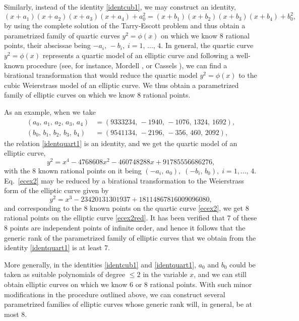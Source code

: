 \documentclass[11pt, leqno]{article}
\begin{document}
Similarly, instead of the identity \eqref{identcub1}, we may construct an identity,
 \begin{equation}
(x+a_1)(x+a_2)(x+a_3)(x+a_4)+a_0^2=(x+b_1)(x+b_2)(x+b_3)(x+b_4)+b_0^2, \label{identquart1}
\end{equation}
by using the complete solution of the Tarry-Escott problem \cite[p. 55-58]{Di} and thus obtain a parametrized family of quartic curves 
$y^2=\phi(x)$  on which we know  8 rational points, their  abscissae  being $-a_i,\,-b_i,\;i=1,\,\ldots,\,4$. In general, the quartic curve $y^2=\phi(x)$ represents a quartic model of an elliptic curve and following a well-known procedure (see, for instance, Mordell \cite[p. 77]{Mo}, or Cassels \cite[pp. 35-36]{Ca2}), we can find a birational transformation that would reduce the quartic model $y^2=\phi(x)$ to the cubic Weierstrass model of an elliptic curve. We thus obtain a parametrized family of elliptic curves on which we know 8  rational points. 

As an example, when we take 
\begin{equation*}
\begin{aligned}
(a_0,\,a_1,\,a_2,\,a_3,\,a_4)&=(9333234,\, -1940, \, -1076, \, 1324, \, 1692),\\
(b_0,\,b_1,\,b_2,\,b_3,\,b_4)&=(9541134,\, -2196,\, -356,\, 460,\, 2092),
\end{aligned}
\end{equation*}
the relation \eqref{identquart1} is an identity, and we get the quartic model of an elliptic curve,
\begin{equation}
y^2=x^4-4768608x^2-460748288x+91785556686276, \label{ecex2}
\end{equation}
with the 8 known rational points on it being $(-a_i,\,a_0),\;(-b_i,\,b_0),\;i=1,\ldots,\,4$. Eq.~\eqref{ecex2} may be reduced by a birational transformation to the Weierstrass form of the elliptic curve given by
\begin{equation}
 y^2 = x^3 - 23420131301937 + 18114867816009096080, \label{ecex2red}
\end{equation}
and corresponding to the 8 known points on the quartic curve \eqref{ecex2}, we get 8 rational points on the elliptic curve \eqref{ecex2red}. It has been verified that 7 of these 8 points are independent points of infinite order, and hence it follows that the generic rank of the parametrized family of elliptic curves that we obtain from the identity \eqref{identquart1} is at least 7.
 
More generally, in the identities \eqref{identcub1} and \eqref{identquart1}, $a_0$ and $b_0$ could be taken as suitable polynomials of degree $\leq  2$ in the variable $x$, and we can still obtain elliptic curves on which we know  6 or 8 rational points. With such minor modifications in the procedure outlined above, we can construct several parametrized families of elliptic curves whose generic rank will, in general,  be at most 8. 
\end{document}
